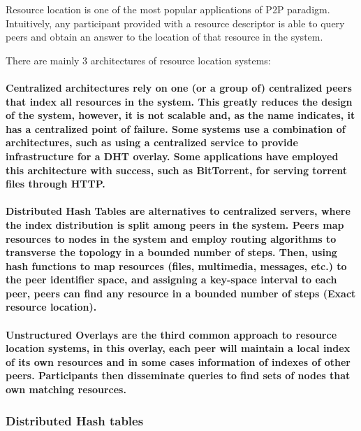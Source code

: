 


Resource location is one of the most popular applications of P2P paradigm. Intuitively, any participant provided with a resource descriptor is able to query peers and obtain an answer to the location of that resource in the system. 

There are mainly 3 architectures of resource location systems:

\paragraph{ \textbf{Centralized} architectures rely on one (or a group of) centralized peers that index all resources in the system. This greatly reduces the design of the system, however, it is not scalable and, as the name indicates, it has a centralized point of failure. Some systems use a combination of architectures, such as using a centralized service to provide infrastructure for a DHT overlay. Some applications have employed this architecture with success, such as BitTorrent, for serving torrent files through HTTP.}

\paragraph{ \textbf{Distributed Hash Tables} are alternatives to centralized servers, where the index distribution is split among peers in the system. Peers map resources to nodes in the system and employ routing algorithms to transverse the topology in a bounded number of steps. Then, using hash functions to map resources (files, multimedia, messages, etc.) to the peer identifier space, and assigning a key-space interval to each peer, peers can find any resource in a bounded number of steps (Exact resource location).}

\paragraph{ \textbf{Unstructured Overlays} are the third common approach to resource location systems, in this overlay, each peer will maintain a local index of its own resources and in some cases information of indexes of other peers. Participants then disseminate queries to find sets of nodes that own matching resources.}

\subsubsection{Distributed Hash tables}

